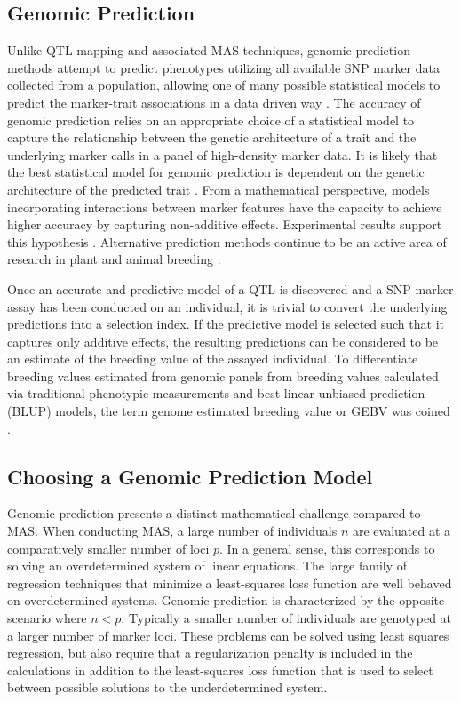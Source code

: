 \subsection*{Genomic Prediction}

Unlike QTL mapping and associated MAS techniques, genomic prediction methods 
attempt to predict phenotypes utilizing all available SNP marker data collected 
from a population, allowing one of many possible statistical models to predict 
the marker-trait associations in a data driven way \citep{meuwissen2001}. 
The accuracy of genomic prediction relies on an appropriate choice of a 
statistical model to capture the relationship between the genetic architecture
of a trait and the underlying marker calls in a panel of high-density marker 
data. It is likely that the best statistical model for genomic prediction is 
dependent on the genetic architecture of 
the predicted trait \citep{crossa2010, gonzalez-camacho2012, 
resende2012, cleveland2012, thavamanikumar2015}.  From a mathematical perspective,
models incorporating interactions between marker features have the 
capacity to achieve higher accuracy by capturing non-additive effects.
Experimental results support this hypothesis \citep{gonzalez-camacho2012}. 
Alternative prediction methods continue to be an active area of research 
in plant and animal breeding \citep{koning2012}.

Once an accurate and predictive model of a QTL is discovered and a SNP marker
assay has been conducted on an individual, it is trivial to convert the underlying
predictions into a selection index. If the predictive model is selected 
such that it captures only additive effects, the resulting predictions can be 
considered to be an estimate of the breeding value of the assayed individual.
To differentiate breeding values estimated from genomic panels from breeding values
calculated via traditional phenotypic measurements and best linear unbiased prediction (BLUP)
models, the term genome estimated breeding value or GEBV was coined \citep{meuwissen2001}.

\subsection*{Choosing a Genomic Prediction Model}

Genomic prediction presents a distinct mathematical challenge compared to MAS.
When conducting MAS, a large number of individuals $n$ are evaluated at a
comparatively smaller number of loci $p$. In a general sense, this corresponds 
to solving an overdetermined system of linear equations. The large family of 
regression techniques that minimize a least-squares loss function are well
behaved on overdetermined systems. Genomic prediction is characterized by the opposite
scenario where $n < p$. Typically a smaller number of individuals are genotyped
at a larger number of marker loci. These problems can be solved using least squares regression,
but also require that a regularization penalty is included in the calculations in 
addition to the least-squares loss function that is used to select between 
possible solutions to the underdetermined system.

